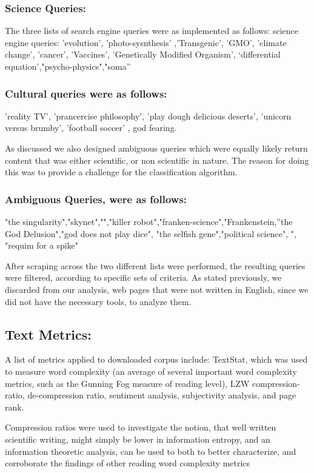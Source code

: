\documentclass{clv3}
\begin{document}
\subsubsection{Science Queries:}
The three lists of search engine queries were as implemented as follows: science engine queries: 'evolution', 'photo-sysnthesis' ,'Transgenic', 'GMO', 'climate change', 'cancer', 'Vaccines', 'Genetically Modified Organism', ‘differential equation’,"psycho-physics","soma”

\subsubsection{Cultural queries were as follows:} 'reality TV', 'prancercise philosophy', 'play dough delicious deserts', 'unicorn versus brumby', 'football soccer' , god fearing.

As discussed we also designed ambiguous queries which were equally likely return content that was either scientific, or non scientific in nature. The reason for doing this was to provide a challenge for the classification algorithm.

\subsubsection{Ambiguous Queries, were as follows:}

"the singularity","skynet","","killer robot","franken-science","Frankenstein,”the God Delusion","god does not play dice", "the selfish gene","political science", ", "requim for a spike"


After scraping across the two different lists were performed, the resulting queries were filtered, according to specific sets of criteria. As stated previously, we discarded from our analysis, web pages that were not written in English, since we did not have the necessary tools, to analyze them.

\subsection{Text Metrics:}
A list of metrics applied to downloaded corpus include: TextStat, which was used to measure word complexity (an average of several important word complexity metrics, such as the Gunning Fog measure of reading level), LZW compression-ratio, de-compression ratio, sentiment analysis, subjectivity analysis, and page rank.

Compression ratios were used to investigate the notion, that well written scientific writing, might simply be lower in information entropy, and an information theoretic analysis, can be used to both to better characterize, and corroborate the findings of other reading word complexity metrics
\end{document}
